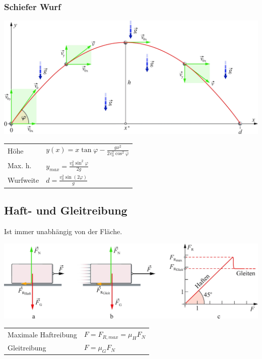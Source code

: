 \documentclass[a4paper]{scrartcl}
\begin{document}
\subsubsection{Schiefer Wurf}
	\begin{multicols}{2}
		\includegraphics[width=\linewidth]{img/wurf_schief}

		\begin{tabu} {l X}
			Höhe & $y(x) = x \tan \varphi - \frac{g x^2}{2 v^2_0 \cos^2 \varphi}$ \\
			Max. h. & $y_{max} = \frac{v^2_0 \sin^2 \varphi}{2g}$ \\
			Wurfweite & $d = \frac{v^2_0 \sin(2\varphi)}{g}$
		\end{tabu}
	\end{multicols}

\subsection{Haft- und Gleitreibung}
	Ist immer unabhängig von der Fläche.
	
	\includegraphics[width=\linewidth]{img/reibung}
	
	\begin{tabu}{l X}
		Maximale Haftreibung & $F = F_{R,max} = \mu_H F_N$\\
		Gleitreibung & $F = \mu_G F_N$
	\end{tabu}
	
\end{document}

